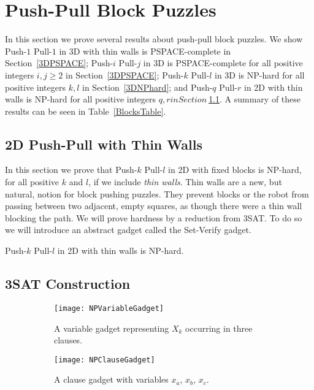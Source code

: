 
\section{Push-Pull Block Puzzles}
In this section we prove several results about push-pull block puzzles. We show Push-$1$ Pull-$1$ in 3D with thin walls is PSPACE-complete in Section~\ref{3DPSPACE}; Push-$i$ Pull-$j$ in 3D is PSPACE-complete for all positive integers $i,j \geq 2$ in Section~\ref{3DPSPACE}; Push-$k$ Pull-$l$ in 3D is NP-hard for all positive integers $k, l$ in Section~\ref{3DNPhard}; and Push-$q$ Pull-$r$ in 2D with thin walls is NP-hard for all positive integers $q, r in Section~$\ref{2DNPhard}. A summary of these results can be seen in Table~\ref{BlocksTable}.


\subsection{2D Push-Pull with Thin Walls}
\label{2DNPhard}
In this section we prove that Push-$k$ Pull-$l$ in 2D with fixed blocks is NP-hard, for all positive $k$ and $l$, if we include \emph{thin walls}. Thin walls are a new, but natural, notion for block pushing puzzles. They prevent blocks or the robot from passing between two adjacent, empty squares, as though there were a thin wall blocking the path. We will prove hardness by a reduction from 3SAT. To do so we will introduce an abstract gadget called the Set-Verify gadget.

\begin{theorem}
\label{thm:2DNPhard}
Push-$k$ Pull-$l$ in 2D with thin walls is NP-hard.
\end{theorem}

\subsection{3SAT Construction}
\label{sec:2DPushPull3SAT}
\begin{figure}[!h]
  \centering
  \begin{subfigure}[b]{0.45\textwidth}
    \texttt{[image: NPVariableGadget]}
    \caption{A variable gadget representing $X_k$ occurring in three clauses.}
    \label{fig:NPVariableGadget}
  \end{subfigure}
  \begin{subfigure}[b]{0.45\textwidth}
    \texttt{[image: NPClauseGadget]}
    \caption{A clause gadget with variables $x_a$, $x_b$, $x_c$.}
    \label{fig:NPClauseGadget}
  \end{subfigure}
  \caption{}
\end{figure}

